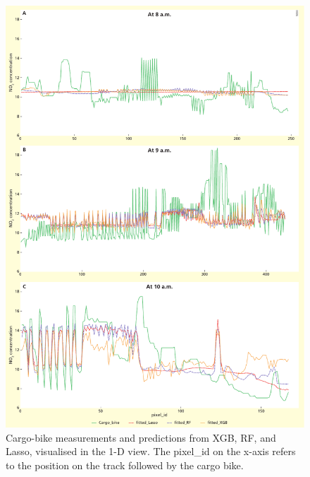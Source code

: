 \documentclass{article}
\begin{document}
\begin{figure}[H]
    \includegraphics[width=\linewidth]{graphs.pdf}
    
    \caption {Cargo-bike measurements and predictions from XGB,  RF, and Lasso, visualised in the 1-D view. The pixel_id on the x-axis refers to the position on the track followed by the cargo bike.}
    \label{a1d}
\end{figure}

 
\end{document}
